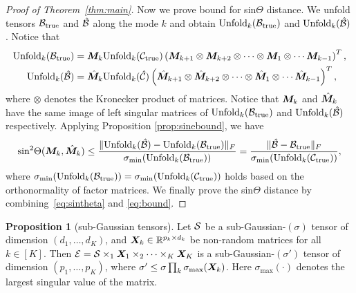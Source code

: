 \documentclass[12pt]{article}
\theoremstyle{definition}
\newtheorem{prop}{Proposition}
\theoremstyle{definition}
\begin{document}
\begin{proof}[Proof of Theorem~\ref{thm:main}]
Now we prove bound for sin$\Theta$ distance. 
We unfold tensors $\mathcal{B}_{\textup{true}}$ and $\hat{\mathcal{B}}$ along the mode $k$ and obtain $\text{Unfold}_k(\mathcal{B}_{\textup{true}})$ and $\text{Unfold}_k(\hat{\mathcal{B}})$. Notice that 
\begin{align}
    \text{Unfold}_k(\mathcal{B}_{\textup{true}}) &= \bm M_k \text{Unfold}_k(\mathcal{C}_{\textup{true}})\left(\bm M_{k+1}\otimes\bm M_{k+2}\otimes \cdots\otimes \bm M_1\otimes \cdots\bm M_{k-1}\right)^T,\\
    \text{Unfold}_k(\hat{\mathcal{B}}) &= \hat{\bm M}_k \text{Unfold}_k(\hat{\mathcal{C}})\left(\hat{\bm M}_{k+1}\otimes\hat{\bm M}_{k+2}\otimes \cdots\otimes \hat{\bm M}_1\otimes \cdots\hat{\bm M}_{k-1}\right)^T,
\end{align} where $\otimes$ denotes the Kronecker product of matrices.
Notice that $\bm M_k$ and $\hat{\bm M}_k$ have the same image of left singular matrices of $\text{Unfold}_k(\mathcal{B}_{\textup{true}})$ and $\text{Unfold}_k(\hat{\mathcal{B}})$ respectively.  Applying Proposition \ref{prop:sinebound}, we have
\begin{align}\label{eq:sintheta}
    \text{sin}^2\Theta(\bm M_k,\hat{\bm M}_k)\leq \frac{\lVert\text{Unfold}_k(\hat{\mathcal{B}})-\text{Unfold}_k(\mathcal{B}_{\textup{true}})\rVert_F}{\sigma_{\text{min}}(\text{Unfold}_k(\mathcal{B}_{\textup{true}}))}= \frac{\lVert\hat{\mathcal{B}}-\mathcal{B}_{\textup{true}}\rVert_F}{\sigma_{\text{min}}(\text{Unfold}_k(\mathcal{C}_{\textup{true}}))},
\end{align} where $\sigma_{\text{min}}(\text{Unfold}_k(\mathcal{B}_{\textup{true}})) = \sigma_{\text{min}}(\text{Unfold}_k(\mathcal{C}_{\textup{true}}))$ holds based on the orthonormality of factor matrices. We finally prove the sin$\Theta$ distance by combining~\eqref{eq:sintheta} and \eqref{eq:bound}.
\end{proof}



\begin{prop}[sub-Gaussian tensors]\label{prop:sub}
Let $\mathcal{S}$ be a sub-Gaussian-$(\sigma)$ tensor of dimension $(d_1,\ldots,d_K)$, and $\bm X_k\in\mathbb{R}^{p_k\times d_k}$ be non-random matrices for all $k\in[K]$. Then $\mathcal{E}=\mathcal{S} \times_1  \bm X_1\times_2\cdots\times_K  \bm X_K$ is a sub-Gaussian-$(\sigma')$ tensor of dimension $(p_1,\ldots,p_K)$, where $\sigma'\leq \sigma \prod_k\sigma_{\max}(\bm X_k)$. Here $\sigma_{\max}(\cdot)$ denotes the largest singular value of the matrix. 
\end{prop}
\end{document}
